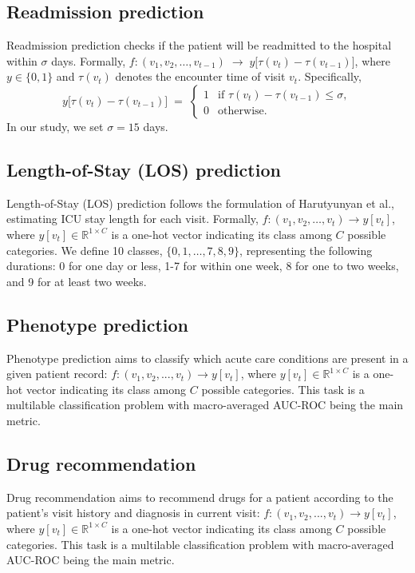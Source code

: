 \subsection{Readmission prediction}
Readmission prediction checks if the patient will be readmitted
to the hospital within \(\sigma\) days. Formally, $f : (v_1, v_2, \ldots, v_{t-1}) \;\to\; y\bigl[\tau(v_t) - \tau(v_{t-1})\bigr]$,
where \(y \in \{0, 1\}\) and \(\tau(v_t)\) denotes the encounter time of visit
\(v_t\). Specifically,
\[
    y\bigl[\tau(v_t) - \tau(v_{t-1})\bigr] \;=\;
    \begin{cases}
        1 & \text{if } \tau(v_t) - \tau(v_{t-1}) \le \sigma,\\
        0 & \text{otherwise}.
    \end{cases}
\]
In our study, we set \(\sigma = 15\) days.

\subsection{Length-of-Stay (LOS) prediction}

Length-of-Stay (LOS) prediction follows the formulation of Harutyunyan et al., estimating ICU stay length for each visit. Formally, $f : (v_1, v_2, \ldots, v_t) \to y[v_t]$, where $y[v_t] \in \mathbb{R}^{1 \times C}$ is a one-hot vector indicating its class among $C$ possible categories. We define 10 classes, $\{0,1,\ldots,7,8,9\}$, representing the following durations: 0 for one day or less, 1-7 for within one week, 8 for one to two weeks, and 9 for at least two weeks.

\subsection{Phenotype prediction}
Phenotype prediction aims to classify which acute care conditions are present in a given patient record: $f: (v_1, v_2, ..., v_t) \rightarrow y[v_t]$, where $y[v_t] \in \mathbb{R}^{1 \times C}$ is a one-hot vector indicating its class among $C$ possible categories. This task is a multilable classification problem with macro-averaged AUC-ROC being the main metric.

\subsection{Drug recommendation}
Drug recommendation aims to recommend drugs for a patient according to the patient's visit history and diagnosis in current visit: $f: (v_1, v_2, ..., v_t) \rightarrow y[v_t]$, where $y[v_t] \in \mathbb{R}^{1 \times C}$ is a one-hot vector indicating its class among $C$ possible categories. This task is a multilable classification problem with macro-averaged AUC-ROC being the main metric.

